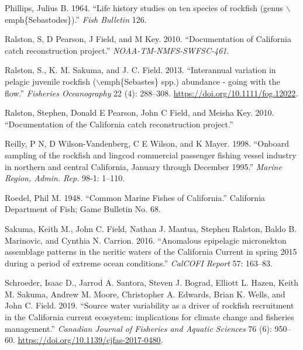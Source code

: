 \documentclass[
  english,
  a4paper,
]{article}
\newlength{\cslhangindent}
\newlength{\cslentryspacingunit} %
\newenvironment{CSLReferences}[2] %
 {%
  \setlength{\parindent}{0pt}
  \ifodd #1
  \let\oldpar\par
  \def\par{\hangindent=\cslhangindent\oldpar}
  \fi
  \setlength{\parskip}{#2\cslentryspacingunit}
 }%
 {}
\begin{document}
\begin{CSLReferences}{1}{0}
\leavevmode{}%
Phillips, Julius B. 1964. {``{Life history studies on ten species of rockfish (genus \(\backslash\)emph{\{}Sebastodes{\}})}.''} \emph{Fish Bulletin} 126.

\leavevmode{}%
Ralston, S, D Pearson, J Field, and M Key. 2010. {``{Documentation of California catch reconstruction project.}''} \emph{NOAA-TM-NMFS-SWFSC-461}.

\leavevmode{}%
Ralston, S., K. M. Sakuma, and J. C. Field. 2013. {``{Interannual variation in pelagic juvenile rockfish (\(\backslash\)emph{\{}Sebastes{\}} spp.) abundance - going with the flow}.''} \emph{Fisheries Oceanography} 22 (4): 288--308. \url{https://doi.org/10.1111/fog.12022}.

\leavevmode{}%
Ralston, Stephen, Donald E Pearson, John C Field, and Meisha Key. 2010. {``{Documentation of the California catch reconstruction project}.''}

\leavevmode{}%
Reilly, P N, D Wilson-Vandenberg, C E Wilson, and K Mayer. 1998. {``{Onboard sampling of the rockfish and lingcod commercial passenger fishing vessel industry in northern and central California, January through December 1995.}''} \emph{Marine Region, Admin. Rep.} 98-1: 1--110.

\leavevmode{}%
Roedel, Phil M. 1948. {``{Common Marine Fishes of California}.''} California Department of Fish; Game Bulletin No. 68.

\leavevmode{}%
Sakuma, Keith M., John C. Field, Nathan J. Mantua, Stephen Ralston, Baldo B. Marinovic, and Cynthia N. Carrion. 2016. {``{Anomalous epipelagic micronekton assemblage patterns in the neritic waters of the California Current in spring 2015 during a period of extreme ocean conditions}.''} \emph{CalCOFI Report} 57: 163--83.

\leavevmode{}%
Schroeder, Isaac D., Jarrod A. Santora, Steven J. Bograd, Elliott L. Hazen, Keith M. Sakuma, Andrew M. Moore, Christopher A. Edwards, Brian K. Wells, and John C. Field. 2019. {``{Source water variability as a driver of rockfish recruitment in the California current ecosystem: implications for climate change and fisheries management}.''} \emph{Canadian Journal of Fisheries and Aquatic Sciences} 76 (6): 950--60. \url{https://doi.org/10.1139/cjfas-2017-0480}.


\end{CSLReferences}
\end{document}

